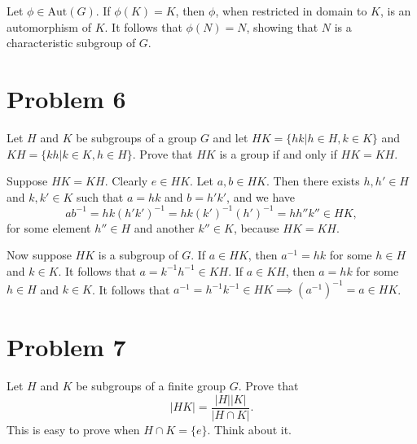 \documentclass[12pt]{article}
\newcommand{\aut}{\mbox{Aut}}
\begin{document}
Let $\phi\in\aut(G)$.  If $\phi(K)=K$, then $\phi$, when restricted in
domain to $K$, is an automorphism of $K$.  It follows that
$\phi(N)=N$, showing that $N$ is a characteristic subgroup of $G$.

\section*{Problem 6}

Let $H$ and $K$ be subgroups of a group $G$ and let $HK=\{hk|h\in H,k\in K\}$
and $KH=\{kh|k\in K,h\in H\}$.  Prove that $HK$ is a group if and only if
$HK=KH$.

Suppose $HK=KH$.  Clearly $e\in HK$.  Let $a,b\in HK$.
Then there exists $h,h'\in H$ and $k,k'\in K$ such that
$a=hk$ and $b=h'k'$, and we have
\begin{equation*}
ab^{-1}=hk(h'k')^{-1}=hk(k')^{-1}(h')^{-1} = hh''k''\in HK,
\end{equation*}
for some element $h''\in H$ and another $k''\in K$, because
$HK=KH$.

Now suppose $HK$ is a subgroup of $G$.  If $a\in HK$,
then $a^{-1}=hk$ for some $h\in H$ and $k\in K$.
It follows that $a=k^{-1}h^{-1}\in KH$.
If $a\in KH$, then $a=hk$ for some $h\in H$ and $k\in K$.
It follows that $a^{-1}=h^{-1}k^{-1}\in HK\implies (a^{-1})^{-1}=a\in HK$.

\section*{Problem 7}

Let $H$ and $K$ be subgroups of a finite group $G$.  Prove that
\begin{equation*}
|HK|=\frac{|H||K|}{|H\cap K|}.
\end{equation*}
This is easy to prove when $H\cap K=\{e\}$.  Think about it.
\end{document}
